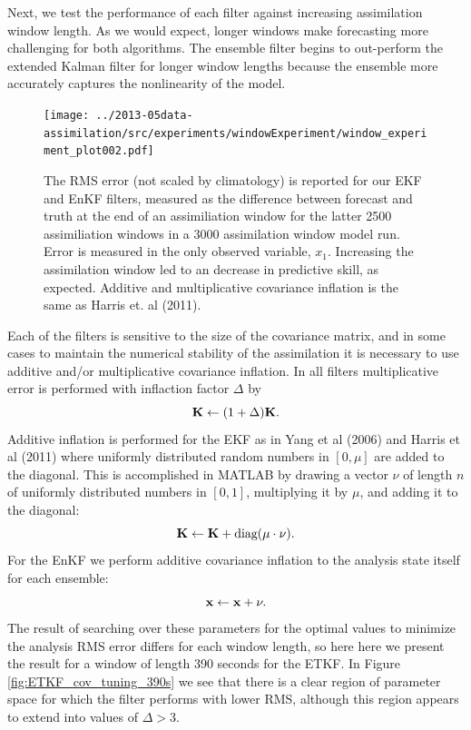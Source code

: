 \documentclass[12pt]{report}
\begin{document}
Next, we test the performance of each filter against increasing assimilation window length.
As we would expect, longer windows make forecasting more challenging for both algorithms.
The ensemble filter begins to out-perform the extended Kalman filter for longer window lengths because the ensemble more accurately captures the nonlinearity of the model.

\begin{figure}[h!]
  \centering
  \texttt{[image: ../2013-05data-assimilation/src/experiments/windowExperiment/window\_experiment\_plot002.pdf]}
  \caption[The RMS error is reported for our EKF and EnKF filters]{
    The RMS error (not scaled by climatology) is reported for our EKF and EnKF filters, measured as the difference between forecast and truth at the end of an assimiliation window for the latter 2500 assimiliation windows in a 3000 assimilation window model run.
    Error is measured in the only observed variable, $x_1$.
    Increasing the assimilation window led to an decrease in predictive skill, as expected.
    Additive and multiplicative covariance inflation is the same as Harris et. al (2011).
  }
  \label{fig:window_test}
\end{figure}

Each of the filters is sensitive to the size of the covariance matrix, and in some cases to maintain the numerical stability of the assimilation it is necessary to use additive and/or multiplicative covariance inflation.
In all filters multiplicative error is performed with inflaction factor $\Delta$ by
\begin{equation} \mathbf{K} \leftarrow (1+\Delta) \mathbf{K} .\end{equation}
Additive inflation is performed for the EKF as in Yang et al (2006) and Harris et al (2011) where uniformly distributed random numbers in $[0,\mu]$ are added to the diagonal.
This is accomplished in MATLAB by drawing a vector  $\nu$ of length $n$ of uniformly distributed numbers in $[0,1]$, multiplying it by $\mu$, and adding it to the diagonal:
\begin{equation} \mathbf{K} \leftarrow \mathbf{K} + \text{diag}(\mu\cdot \nu).\end{equation}
For the EnKF we perform additive covariance inflation to the analysis state itself for each ensemble:
\begin{equation} \mathbf{x} \leftarrow \mathbf{x} + \nu .\end{equation}
The result of searching over these parameters for the optimal values to minimize the analysis RMS error differs for each window length, so here here we present the result for a window of length 390 seconds for the ETKF.
In Figure \ref{fig:ETKF_cov_tuning_390s} we see that there is a clear region of parameter space for which the filter performs with lower RMS, although this region appears to extend into values of $\Delta > 3$.
\end{document}
